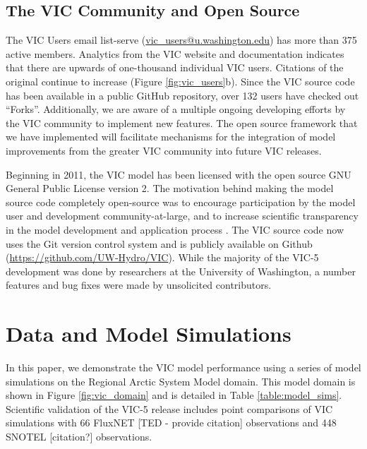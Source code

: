\documentclass[gmd, manuscript]{copernicus}
\begin{document}
  \subsection{The VIC Community and Open Source}
    \label{sec:vic_community}
    The VIC Users email list-serve (\url{vic_users@u.washington.edu}) has more than 375 active members.
    Analytics from the VIC website and documentation indicates that there are upwards of one-thousand individual VIC users.
    Citations of the original \citep{Liang_1994} continue to increase (Figure \ref{fig:vic_users}b).
    Since the VIC source code has been available in a public GitHub repository, over 132 users have checked out ``Forks''.
    Additionally, we are aware of a multiple ongoing developing efforts by the VIC community to implement new features.
    The open source framework that we have implemented will facilitate mechanisms for the integration of model improvements from the greater VIC community into future VIC releases.

    Beginning in 2011, the VIC model has been licensed with the open source GNU General Public License version 2.
    The motivation behind making the model source code completely open-source was to encourage participation by the model user and development community-at-large, and to increase scientific transparency in the model development and application process \citep{Ince_2012}.
    The VIC source code now uses the Git version control system \citep{Torvalds_2010} and is publicly available on Github (\url{https://github.com/UW-Hydro/VIC}).
    While the majority of the VIC-5 development was done by researchers at the University of Washington, a number features and bug fixes were made by unsolicited contributors.

\section{Data and Model Simulations}
  \label{sec:data_and_sims}
  In this paper, we demonstrate the VIC model performance using a series of model simulations on the Regional Arctic System Model domain.
  This model domain is shown in Figure \ref{fig:vic_domain} and is detailed in Table \ref{table:model_sims}.
  Scientific validation of the VIC-5 release includes point comparisons of VIC simulations with 66 FluxNET [TED - provide citation] observations and 448 SNOTEL [citation?] observations.
\end{document}
